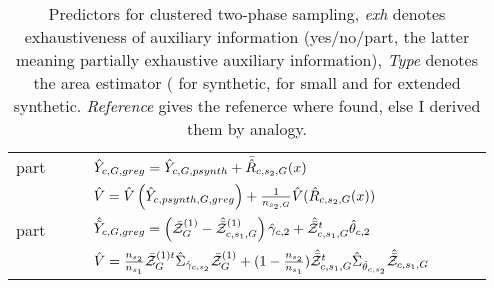 \begin{table}
\begin{tabular}{l l l l l r l}
part 	&  \psmall{} 	& \analogy{} & $ \hat{Y}_{c,G,greg} = \hat{Y}_{c,G,psynth} + \bar{\hat{R}}_{c,s_2,G}(x) $\\
	    	&      	& \analogy{} & $ \hat{V}  = \hat{V}\left(\hat{Y}_{c,psynth, G,greg}\right)  + \frac{1}{n_{s_2,G}}\hat{V}(\hat{R}_{c,s_2,G}(x))$\\
\lightrule
part 	&  \pextended{} 	& \cite[eq. 50]{Man13b.e} & $\hat{\tilde{Y}}_{c,G,greg} = \left( \bar{\mathcal{Z}}_G^{(1)}- \hat{\bar{\mathcal{Z}}}_{c,s_1,G}^{(1)}\right) \hat{\gamma}_{c,2} + \hat{\bar{\mathcal{Z}}}^t_{c,s_1,G}\hat{\theta}_{c,2} $\\
        &    	&     \cite[eq. 52]{Man13b.e} &$\hat{V} = \frac{n_{s_2}}{n_{s_1}}\bar{\mathcal{Z}}^{(1)t}_G \hat{\Sigma}_{ \hat{\gamma}_{c,s_2}} \bar{\mathcal{Z}}^{(1)}_G + (1-\frac{n_{s_2}}{n_{s_1}})\hat{\bar{\mathcal{Z}}}^{t}_{c,s_1,G}
\hat{\Sigma}_{ \hat{\theta}_{c,s_2}} \hat{\bar{\mathcal{Z}}}_{c,s_1,G} $\\
\end{tabular}
\caption{Predictors for clustered two-phase sampling, 
    \emph{exh} denotes exhaustiveness of auxiliary information (yes/no/part, the
    latter meaning partially exhaustive auxiliary information),
    \emph{Type} denotes the area estimator (\psynthetic{} for synthetic, \psmall{}
    for small and \pextended{} for extended synthetic. \emph{Reference} gives the
    refenerce where found, else I derived them by analogy. \label{tab:clustered2}
}
\end{table}
